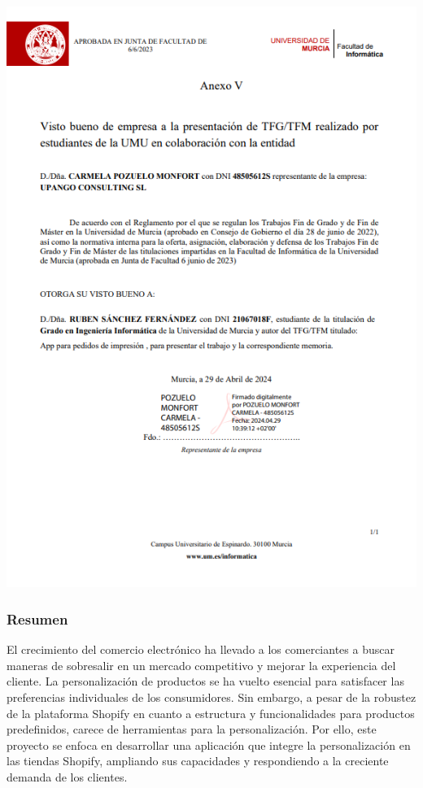 \documentclass[12pt]{article}
\begin{document}
\pagestyle{empty}
\setcounter{page}{1}
\part*{}
\tableofcontents
\newpage
\listoffigures
\listoftables
\newpage
\clearpage
\pagestyle{fancy}

% 
\includegraphics[width=1\textwidth]{Anexo_Firmado_Upango.png}

\clearpage
\section{Resumen}
El crecimiento del comercio electrónico ha llevado a los comerciantes a buscar maneras de sobresalir en un mercado competitivo y mejorar 
la experiencia del cliente. La personalización de productos se ha vuelto esencial para satisfacer las preferencias individuales de los consumidores. 
Sin embargo, a pesar de la robustez de la plataforma Shopify en cuanto a estructura y funcionalidades para productos predefinidos, carece de herramientas 
para la personalización. Por ello, este proyecto se enfoca en desarrollar una aplicación que integre la personalización en las tiendas Shopify, 
ampliando sus capacidades y respondiendo a la creciente demanda de los clientes.
\end{document}
